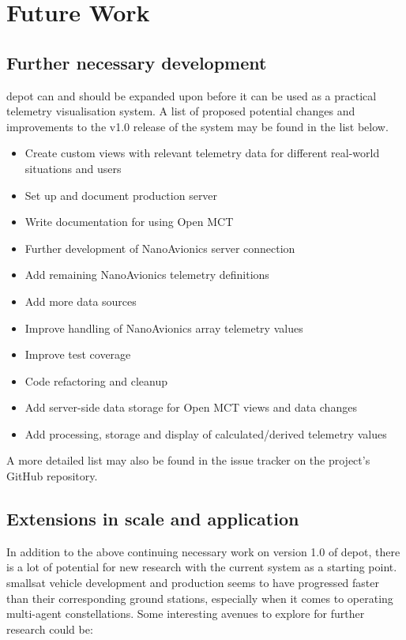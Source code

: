 \begin{comment}
Adding more inputs to the system, such as UAVs/autonaut/etc.

Adding custom visualizations

Add image/data output from imager
\end{comment}

\section{Future Work}

\subsection{Further necessary development}
\Gls{depot} can and should be expanded upon before it can be used as a practical telemetry visualisation system. A list of proposed potential changes and improvements to the v1.0 release of the system may be found in the list below.

\begin{itemize}
  \item Create custom views with relevant telemetry data for different real-world situations and users
  \item Set up and document production server
  \item Write documentation for using Open MCT
  \item Further development of NanoAvionics server connection
  \item Add remaining NanoAvionics telemetry definitions
  \item Add more data sources
  \item Improve handling of NanoAvionics array telemetry values
  \item Improve test coverage
  \item Code refactoring and cleanup
  \item Add server-side data storage for Open MCT views and data changes
  \item Add processing, storage and display of calculated/derived telemetry values
\end{itemize}

A more detailed list may also be found in the issue tracker on the project's GitHub repository.

\subsection{Extensions in scale and application}
In addition to the above continuing necessary work on version 1.0 of \Gls{depot}, there is a lot of potential for new research with the current system as a starting point. \Gls{smallsat} vehicle development and production seems to have progressed faster than their corresponding ground stations, especially when it comes to operating multi-agent constellations. Some interesting avenues to explore for further research could be:

